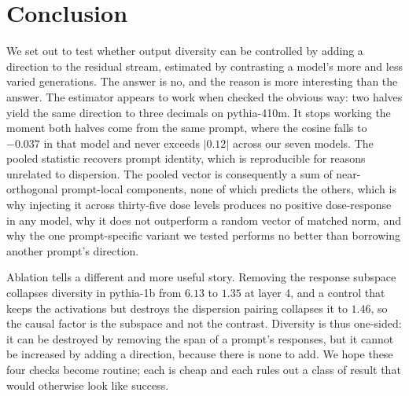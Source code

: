\section{Conclusion}

We set out to test whether output diversity can be controlled by adding a direction to the residual
stream, estimated by contrasting a model's more and less varied generations. The answer is no, and
the reason is more interesting than the answer. The estimator appears to work when checked the obvious way:
two halves yield the same direction to three decimals on pythia-410m. It
stops working the moment both halves come from the same prompt, where the cosine falls to $-0.037$
in that model and never exceeds $|0.12|$ across our seven models. The pooled statistic recovers prompt identity, which is reproducible for reasons unrelated to
dispersion. The pooled vector is consequently
a sum of near-orthogonal prompt-local components, none of which predicts the others, which is why
injecting it across thirty-five dose levels produces no positive dose-response in any model, why it
does not outperform a random vector of matched norm, and why the one prompt-specific variant we
tested performs no better than borrowing another prompt's direction.

Ablation tells a different and more useful story. Removing the response subspace collapses diversity
in pythia-1b from $6.13$ to $1.35$ at layer 4, and a control that keeps the activations but destroys
the dispersion pairing collapses it to $1.46$, so the causal factor is the subspace and not the
contrast. Diversity is thus one-sided: it can be destroyed by removing the span of a prompt's
responses, but it cannot be increased by adding a direction, because there is none to add.
We hope these four checks become routine; each is cheap and each rules out a class of result that
would otherwise look like success.
